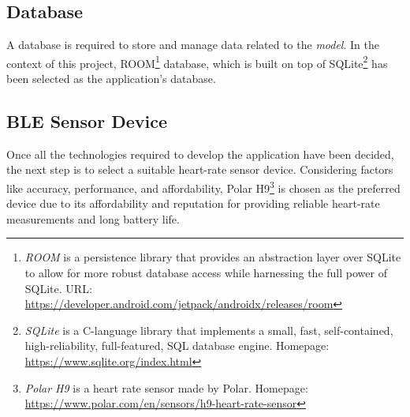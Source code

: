 \subsection{Database}
A database is required to store and manage data related to the \emph{model}. In the context of this project, ROOM\footnote{\emph{ROOM} is a persistence library that provides an abstraction layer over SQLite to allow for more robust database access while harnessing the full power of SQLite. URL: \url{https://developer.android.com/jetpack/androidx/releases/room}} database, which is built on top of SQLite\footnote{\emph{SQLite} is a C-language library that implements a small, fast, self-contained, high-reliability, full-featured, SQL database engine. Homepage: \url{https://www.sqlite.org/index.html}} has been selected as the application's database.

\subsection{BLE Sensor Device}
Once all the technologies required to develop the application have been decided, the next step is to select a suitable heart-rate sensor device. Considering factors like accuracy, performance, and affordability, Polar H9\footnote{\emph{Polar H9} is a heart rate sensor made by Polar. Homepage: \url{https://www.polar.com/en/sensors/h9-heart-rate-sensor}} is chosen as the preferred device due to its affordability and reputation for providing reliable heart-rate measurements and long battery life.